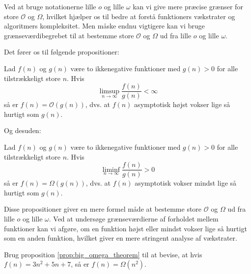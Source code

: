         Ved at bruge notationerne lille $o$ og lille $\omega$ kan vi give mere præcise grænser for store $\mathcal{O}$ og $\Omega$, hvilket hjælper os til bedre at forstå funktioners vækstrater og algoritmers kompleksitet. Men måske endnu vigtigere kan vi bruge grænseværdibegrebet til at bestemme store $\mathcal{O}$ og $\Omega$ ud fra lille $o$ og lille $\omega$.

        Det fører os til følgende propositioner:

        \begin{proposition} \label{prop:big_o_theorem}
            Lad \( f(n) \) og \( g(n) \) være to ikkenegative funktioner med $g(n)>0$ for alle tilstrækkeligt store $n$. Hvis
            \medskip
            \[
            \limsup_{n \rightarrow \infty} \frac{f(n)}{g(n)} < \infty
            \]
            \medskip
            så er \( f(n) = \mathcal{O}(g(n)) \), dvs. at \( f(n) \) asymptotisk højst vokser lige så hurtigt som \( g(n) \).
        \end{proposition}
        
        Og desuden:


        \begin{proposition} \label{prop:big_omega_theorem}
            Lad \( f(n) \) og \( g(n) \) være to ikkenegative funktioner med $g(n)>0$ for alle tilstrækkeligt store $n$. Hvis
            \medskip
            \[
            \liminf_{n \rightarrow \infty} \frac{f(n)}{g(n)} > 0
            \]
            \medskip
            så er \( f(n) = \Omega(g(n)) \), dvs. at \( f(n) \) asymptotisk vokser mindst lige så hurtigt som \( g(n) \).
        \end{proposition}
        
        Disse propositioner giver en mere formel måde at bestemme store $\mathcal{O}$ og $\Omega$ ud fra lille $o$ og lille $\omega$. Ved at undersøge grænseværdierne af forholdet mellem funktioner kan vi afgøre, om en funktion højst eller mindst vokser lige så hurtigt som en anden funktion, hvilket giver en mere stringent analyse af vækstrater.
            
            \begin{example}
            Brug proposition \ref{prop:big_omega_theorem} til at bevise, at hvis \( f(n) = 3n^2 + 5n + 7 \), så er \( f(n) = \Omega(n^2) \).
            \end{example}
            
